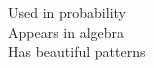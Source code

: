 \documentclass[preview]{standalone}
\begin{document}
Used in probability\\Appears in algebra\\Has beautiful patterns\\
\end{document}

